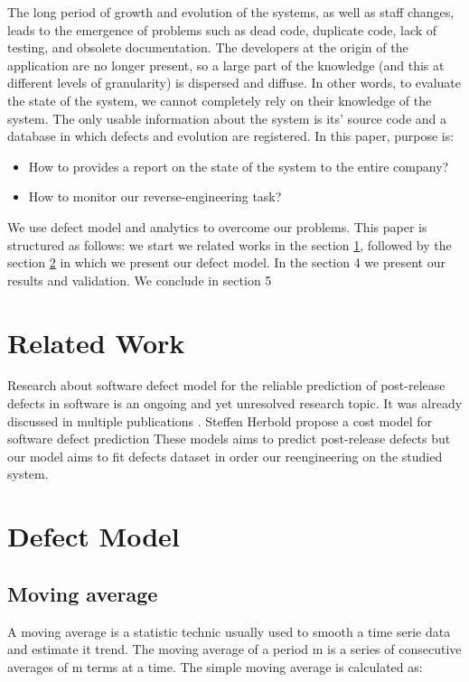 \documentclass[10pt,conference]{IEEEtran}
\begin{document}
	The long period of growth and evolution of the systems, as well as staff changes, leads to the emergence of problems such as dead code, duplicate code, lack of testing, and obsolete documentation. 
	The developers at the origin of the application are no longer present, so a large part of the knowledge (and this at different levels of granularity) is dispersed and diffuse. 
	In other words, to evaluate the state of the system, we cannot completely rely on their knowledge of the system.
	The only usable information about the system is  its' source code and a database in which defects and evolution are registered.
	 In this paper,  purpose is:
	\begin{itemize}
	\item How to provides a report on the state of the system to the entire company?
	\item How to monitor our reverse-engineering task?
	\end{itemize}
	We use defect model and analytics to overcome our problems.
	 This paper is structured as follows: we start we related works in the section \ref{sec:related-work}, followed by  the section \ref{sec:defectModel}  in which we present our defect model. 
	 In the section 4 we present our results and validation. We  conclude in section 5 
	 
	
	\section{Related Work}\label{sec:related-work}
	Research about software defect model for the reliable prediction of post-release defects in software is an ongoing and yet unresolved research topic. It was already discussed in multiple  publications \cite{Catal09,Hall2012, Hoss2017}. 
	Steffen Herbold \cite{Herb19} propose a cost model for software defect prediction
	These models aims to predict post-release defects but our model aims to fit  defects dataset  in order our reengineering on the studied system.   
	\section{Defect Model}\label{sec:defectModel}
	\subsection{Moving average}
	A moving average is a statistic technic usually used to smooth a time serie data and estimate it trend. The moving average of a period m is a series of consecutive averages of m terms at a time. The simple moving average is calculated as:
	
\end{document}
